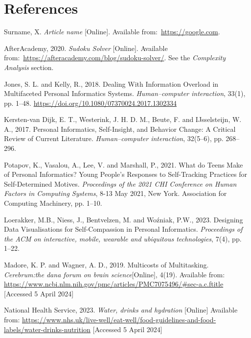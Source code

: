 \documentclass[12pt]{article}
\begin{document}
\section{References}

\renewcommand{\refname}{} 
\vspace{-20pt}
\begin{thebibliography}{99}
     Surname, X. \textit{Article name} [Online].
    Available from:~\url{https://google.com}.

     AfterAcademy, 2020. \textit{Sudoku Solver} [Online].
    Available from:~\url{https://afteracademy.com/blog/sudoku-solver/}. See the
    \textit{Complexity Analysis} section.

    Jones, S. L. and Kelly, R., 2018. 
    Dealing With Information Overload in Multifaceted Personal Informatics Systems. 
    \textit{Human–computer interaction}, 33(1), pp. 1–48. \url{https://doi.org/10.1080/07370024.2017.1302334}

    Kersten-van Dijk, E. T., Westerink, J. H. D. M., Beute, F. and 
    IJsselsteijn, W. A., 2017. 
    Personal Informatics, Self-Insight, and Behavior Change: A Critical Review of Current Literature. 
    \textit{Human–computer interaction}, 32(5–6), pp. 268–296.

    Potapov, K., Vasalou, A., Lee, V. and Marshall, P., 2021. 
    What do Teens Make of Personal Informatics? 
    Young People's Responses to Self-Tracking Practices for Self-Determined Motives. 
    \textit{Proceedings of the 2021 CHI Conference on Human Factors in Computing Systems}, 
    8-13 May 2021, New York. Association for Computing Machinery, pp. 1–10.

    Loerakker, M.B., Niess, J., Bentvelzen, M. and Woźniak, P.W., 2023. 
    Designing Data Visualisations for Self-Compassion in Personal Informatics. 
    \textit{Proceedings of the ACM on interactive, mobile, wearable and ubiquitous technologies}, 7(4), pp. 1–22.

    Madore, K. P. and Wagner, A. D., 2019. Multicosts of Multitasking. 
    \textit{Cerebrum:the dana forum on brain science}[Online], 4(19). Available from:
    \url{https://www.ncbi.nlm.nih.gov/pmc/articles/PMC7075496/#sec-a.c.ftitle} 
    [Accessed 5 April 2024]

    National Health Service, 2023. \textit{Water, drinks and hydration} [Online] 
    Available from: 
    \url{https://www.nhs.uk/live-well/eat-well/food-guidelines-and-food-labels/water-drinks-nutrition} 
    [Accessed 5 April 2024]
    

\end{thebibliography}
\end{document}
